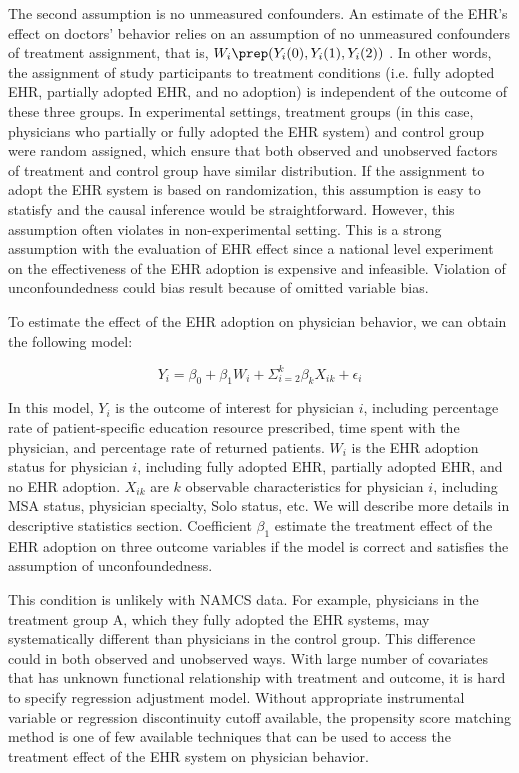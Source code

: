 The second assumption is no unmeasured confounders. An estimate of the EHR's effect on doctors' behavior relies on an assumption of no unmeasured confounders of treatment assignment, that is, $W_i \prep (Y_i(0),Y_i(1),Y_i(2))$ \citep{imbens2008recent}. In other words, the assignment of study participants to treatment conditions (i.e. fully adopted EHR, partially adopted EHR, and no adoption) is independent of the outcome of these three groups. In experimental settings, treatment groups (in this case, physicians who partially or fully adopted the EHR system) and control group were random assigned, which ensure that both observed and unobserved factors of treatment and control group have similar distribution. If the assignment to adopt the EHR system is based on randomization, this assumption is easy to statisfy and the causal inference would be straightforward. However, this assumption often violates in non-experimental setting. This is a strong assumption with the evaluation of EHR effect since a national level experiment on the effectiveness of the EHR adoption is expensive and infeasible. Violation of unconfoundedness could bias result because of omitted variable bias.

To estimate the effect of the EHR adoption on physician behavior, we can obtain the following model:

\begin{equation*}
Y_{i} = \beta_0 + \beta_1 W_i + \Sigma^k_{i=2} \beta_k X_{ik} + \epsilon_{i}
\end{equation*}

In this model, $Y_{i}$ is the outcome of interest for physician $i$, including percentage rate of patient-specific education resource prescribed, time spent with the physician, and percentage rate of returned patients. $W_i$ is the EHR adoption status for physician $i$, including fully adopted EHR, partially adopted EHR, and no EHR adoption. $X_{ik}$ are $k$ observable characteristics for physician $i$, including MSA status, physician specialty, Solo status, etc. We will describe more details in descriptive statistics section. Coefficient $\beta_1$ estimate the treatment effect of the EHR adoption on three outcome variables if the model is correct and satisfies the assumption of unconfoundedness. 

This condition is unlikely with NAMCS data. For example, physicians in the treatment group A, which they fully adopted the EHR systems, may systematically different than physicians in the control group. This difference could in both observed and unobserved ways. With large number of covariates that has unknown functional relationship with treatment and outcome, it is hard to specify regression adjustment model. Without appropriate instrumental variable or regression discontinuity cutoff available, the propensity score matching method is one of few available techniques that can be used to access the treatment effect of the EHR system on physician behavior.

